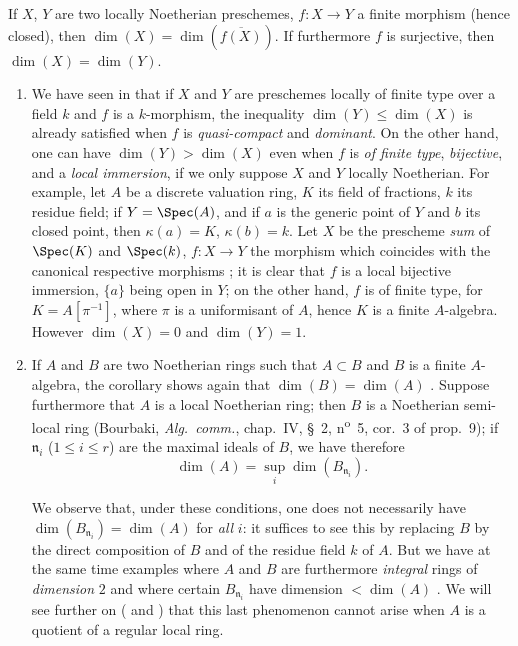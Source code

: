 \begin{corollary}[5.4.2]
\label{IV.5.4.2}
If $X$, $Y$ are two locally Noetherian preschemes, $f:X\to Y$ a finite morphism (hence closed), then $\dim(X)=\dim(\overline{f(X)})$.
If furthermore $f$ is surjective, then $\dim(X)=\dim(Y)$.
\end{corollary}

\begin{remarks}[5.4.3]
\label{IV.5.4.3}
\begin{enumerate}[label=(\roman*)]
  \item We have seen in  that if $X$ and $Y$ are preschemes locally of finite type over a field $k$ and $f$ is a $k$-morphism, the inequality $\dim(Y)\leq\dim(X)$ is already satisfied when $f$ is \emph{quasi-compact} and \emph{dominant}.
On the other hand, one can have $\dim(Y)>\dim(X)$ even when $f$ is \emph{of finite type}, \emph{bijective}, and a \emph{local immersion}, if we only suppose $X$ and $Y$ locally Noetherian.
For example, let $A$ be a discrete valuation ring, $K$ its field of fractions, $k$ its residue field; if $Y=\Spec(A)$, and if $a$ is the generic point of $Y$ and $b$ its closed point, then $\kappa(a)=K$, $\kappa(b)=k$.
Let $X$ be the prescheme \emph{sum} of $\Spec(K)$ and $\Spec(k)$, $f:X\to Y$ the morphism which coincides with the canonical respective morphisms ; it is clear that $f$ is a local bijective immersion, $\{a\}$ being open in $Y$; on the other hand, $f$ is of finite type, for $K=A[\pi^{-1}]$, where $\pi$ is a uniformisant of $A$, hence $K$ is a finite $A$-algebra.
However $\dim(X)=0$ and $\dim(Y)=1$.
  \item If $A$ and $B$ are two Noetherian rings such that $A\subset B$ and $B$ is a finite $A$-algebra, the corollary  shows again that $\dim(B)=\dim(A)$ .
Suppose furthermore that $A$ is a local Noetherian ring; then $B$ is a Noetherian semi-local ring (Bourbaki, \emph{Alg.\ comm.}, chap.~IV, \S~2, n\textsuperscript{o}~5, cor.~3 of prop.~9); if $\mathfrak{n}_i$ ($1\leq i\leq r$) are the maximal ideals of $B$, we have therefore
\[
\tag{5.4.3.1}\label{IV.5.4.3.1}
  \dim(A) = \sup_i \dim(B_{\mathfrak{n}_i}).
\]

We observe that, under these conditions, one does not necessarily have $\dim(B_{\mathfrak{n}_i})=\dim(A)$ for \emph{all} $i$: it suffices to see this by replacing $B$ by the direct composition of $B$ and of the residue field $k$ of $A$.
But we have at the same time examples where $A$ and $B$ are furthermore \emph{integral} rings of \emph{dimension} $2$ and where certain $B_{\mathfrak{n}_i}$ have dimension $<\dim(A)$ .
We will see further on ( and ) that this last phenomenon cannot arise when $A$ is a quotient of a regular local ring.
\end{enumerate}
\end{remarks}

